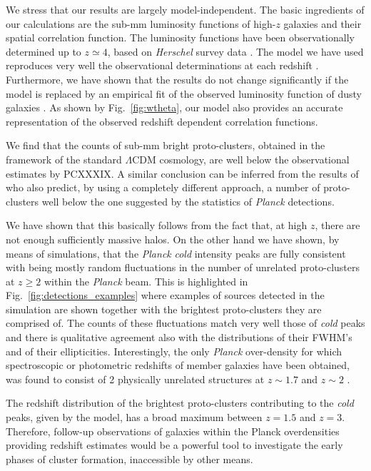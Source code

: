 \documentclass[useAMS,usenatbib]{mn2e}
\begin{document}
We stress that our results are largely model-independent. The basic
ingredients of our calculations are the sub-mm luminosity functions of
high-$z$ galaxies and their spatial correlation function. The
luminosity functions have been observationally
determined up to $z\simeq 4$, based on  \textit{Herschel} survey data
\citep{Gruppioni2013}.
The model we have used reproduces very well the observational
determinations at each redshift
\citep{Cai2013,Bonato2014}. Furthermore, we have shown that the results do not change significantly
if the model is replaced by an empirical fit of the  observed
luminosity function of dusty galaxies \citep{Mancuso2016}. As shown by
Fig.~\ref{fig:wtheta}, our model also provides an accurate representation of the
observed redshift dependent correlation functions.

We find that the counts of sub-mm bright proto-clusters, obtained in the
framework of the standard
$\Lambda$CDM cosmology, are well below the observational estimates by
PCXXXIX. A similar conclusion can be inferred from the results of \cite{Granato2015}
who also predict, by using a completely different approach, a number of
proto-clusters well below the one suggested by the statistics of {\it Planck} detections.

We have shown that this
basically follows from the fact that, at high $z$, there are not
enough sufficiently massive halos. On the other hand we have shown, by means of simulations, that the
\textit{Planck} {\it cold} intensity peaks are fully consistent with
being mostly random fluctuations in the number of unrelated
proto-clusters at $z\ge 2$ within
the \textit{Planck} beam. This is highlighted in Fig.~\ref{fig:detections_examples} where
examples of sources detected in the
simulation are shown together with the brightest
proto-clusters they are comprised of. The counts of these fluctuations match very
well those of {\it cold}
peaks and there is qualitative agreement also with the distributions of their FWHM’s and of their ellipticities.
Interestingly, the only \textit{Planck} over-density for which spectroscopic or
photometric redshifts
of member galaxies have been obtained, was found to consist of 2
physically unrelated structures at $z\sim1.7$ and $z\sim2$
\citep{FloresCacho2015}.

The redshift distribution of the brightest proto-clusters contributing
to the {\it cold} peaks, given by the model, has a broad maximum
between $z=1.5$ and $z=3$.
Therefore, follow-up observations of galaxies within the Planck
overdensities providing redshift estimates would
be a powerful tool to investigate the early phases of cluster formation, inaccessible by other means.
\end{document}
